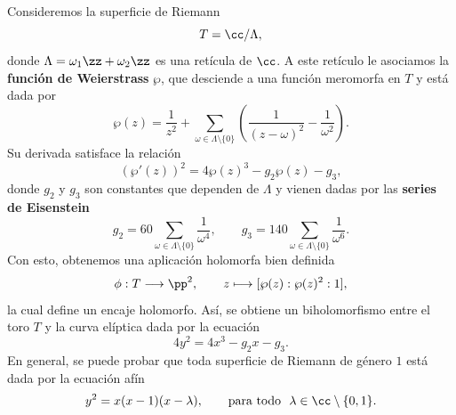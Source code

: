 	\begin{example}\parencite{curvaselipticas}
		Consideremos la superficie de Riemann
		\[
		T=\cc/\Lambda,
		\]
		donde $\Lambda=\omega_1\zz+\omega_2\zz$ es una retícula de $\cc$. A este retículo le asociamos la \textbf{función de Weierstrass} $\wp$, que desciende a una función meromorfa en $T$ y está dada por
		\[
		\wp(z)=\frac{1}{z^2}+\sum_{\omega\in\Lambda\setminus\{0\}}
		\left(\frac{1}{(z-\omega)^2}-\frac{1}{\omega^2}\right).
		\]
		Su derivada satisface la relación
		\[
		(\wp'(z))^2=4\wp(z)^3-g_2\wp(z)-g_3,
		\]
		donde $g_2$ y $g_3$ son constantes que dependen de $\Lambda$ y vienen dadas por las \textbf{series de Eisenstein}
		\[
		g_2=60\sum_{\omega\in\Lambda\setminus\{0\}}\frac{1}{\omega^4},
		\qquad
		g_3=140\sum_{\omega\in\Lambda\setminus\{0\}}\frac{1}{\omega^6}.
		\]
		Con esto, obtenemos una aplicación holomorfa bien definida
		\[
		\phi:T\longrightarrow \pp^2,\qquad
		z\longmapsto [\wp(z):\wp(z)^2:1],
		\]
		la cual define un encaje holomorfo. Así, se obtiene un biholomorfismo entre el toro $T$ y la curva elíptica dada por la ecuación
		\[
		4y^2=4x^3-g_2x-g_3.
		\]
		En general, se puede probar que toda superficie de Riemann de género $1$ está dada por la ecuación afín
		\begin{equation*}
			y^2=x(x-1)(x-\lambda),\qquad \text{para todo }\ \lambda\in\cc\setminus\{0,1\}. 
		\end{equation*}
	\end{example}

